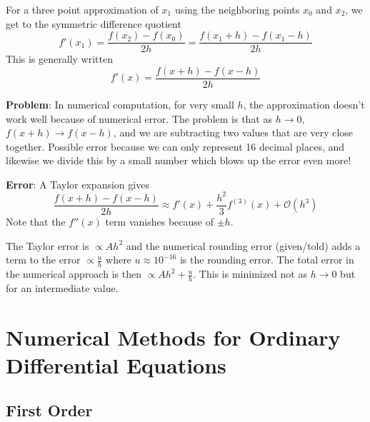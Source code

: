 \documentclass[11pt, a4paper]{article}
\begin{document}
For a three point approximation of $ x_1 $ using the neighboring points $ x_0 $ and $ x_2 $, we get to the symmetric difference quotient
\begin{equation*}
	f'(x_1) = \frac{f(x_2) - f(x_0)}{2h} = \frac{f(x_1 + h) - f(x_1 - h)}{2h}
\end{equation*}
This is generally written 
\begin{equation*}
	f'(x) = \frac{f(x + h) - f(x-h)}{2h}
\end{equation*}

\textbf{Problem}: In numerical computation, for very small $ h $, the approximation doesn't work well because of numerical error. The problem is that as $ h \to 0 $, $ f(x + h) \to f(x-h) $, and we are subtracting two values that are very close together. Possible error because we can only represent 16 decimal places, and likewise we divide this by a small number which blows up the error even more!

\textbf{Error}: A Taylor expansion gives
\begin{equation*}
	\frac{f(x + h) - f(x-h)}{2h} \approx f'(x) + \frac{h^2}{3}f^{(3)}(x) + \mathcal{O}(h^3)
\end{equation*}
Note that the $ f''(x) $ term vanishes because of $ \pm h $.

The Taylor error is $ \propto A h^2 $ and the numerical rounding error (given/told) adds a term to the error $ \propto \frac{u}{h} $ where $ u \approx 10^{-16} $ is the rounding error. The total error in the numerical approach is then $ \propto Ah^2 + \frac{u}{h} $. This is minimized not as $ h \to 0 $ but for an intermediate value.

\newpage

\section{Numerical Methods for Ordinary Differential Equations}
\subsection{First Order}
\end{document}
